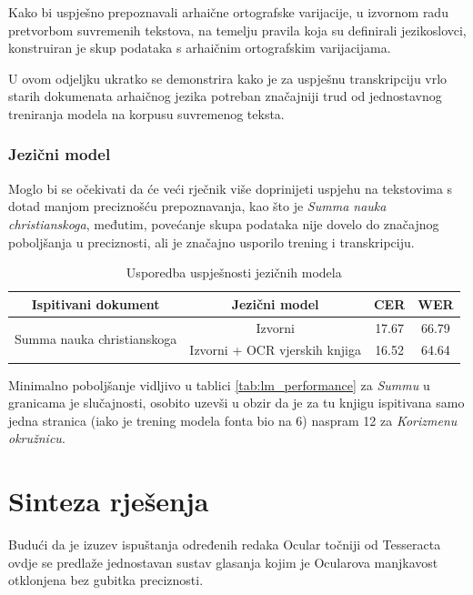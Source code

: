 \documentclass[zavrsnirad]{fer}
\begin{document}
Kako bi uspješno prepoznavali arhaične ortografske varijacije, u izvornom radu \cite{Garrette2016} pretvorbom suvremenih tekstova, na temelju pravila koja su definirali jezikoslovci, konstruiran je skup podataka s arhaičnim ortografskim varijacijama.

U ovom odjeljku ukratko se demonstrira kako je za uspješnu transkripciju vrlo starih dokumenata arhaičnog jezika potreban značajniji trud od jednostavnog treniranja modela na korpusu suvremenog teksta.


\subsection{Jezični model}

Moglo bi se očekivati da će veći rječnik više doprinijeti uspjehu na tekstovima s dotad manjom preciznošću prepoznavanja, kao što je \textit{Summa nauka christianskoga}, međutim, povećanje skupa podataka nije dovelo do značajnog poboljšanja u preciznosti, ali je značajno usporilo trening i transkripciju.

\bgroup
\def\arraystretch{1.25}
\begin{table}[h]
	\centering
	\begin{tabular}{|c|c|c|c|}
		\hline
		\textbf{Ispitivani dokument} & \textbf{Jezični model} & \textbf{CER} & \textbf{WER} \\ \hline
		\multirow{2}{*}{Summa nauka christianskoga} & Izvorni & 17.67 & 66.79 \\ \cline{2-4}
		& Izvorni + OCR vjerskih knjiga & 16.52 & 64.64 \\ \hline
	\end{tabular}
	\caption{Usporedba uspješnosti jezičnih modela}
	\label{tab:ortography_performance}
\end{table}
\egroup

Minimalno poboljšanje vidljivo u tablici \ref{tab:lm_performance} za \textit{Summu} u granicama je slučajnosti, osobito uzevši u obzir da je za tu knjigu ispitivana samo jedna stranica (iako je trening modela fonta bio na 6) naspram 12 za \textit{Korizmenu okružnicu}.

\chapter{Sinteza rješenja}
\label{pog:sinteza_rješenja}

Budući da je izuzev ispuštanja određenih redaka Ocular točniji od Tesseracta ovdje se predlaže jednostavan sustav glasanja kojim je Ocularova manjkavost otklonjena bez gubitka preciznosti.
\end{document}
